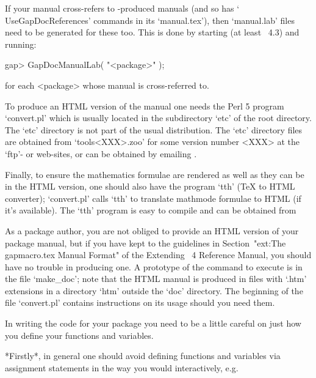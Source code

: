 If your manual cross-refers to -produced manuals (and  so
has  `\\UseGapDocReferences'  commands   in   its   `manual.tex'),   then
`manual.lab' files need to be generated for these too. This  is  done  by
starting {\GAP} (at least {\GAP}~4.3) and running:

gap> GapDocManualLab( "<package>" );

for each <package> whose manual is cross-referred to.

To produce an HTML version of the manual one needs  the  Perl  5  program
`convert.pl' which is usually located in the subdirectory  `etc'  of  the
{\GAP} root directory. The `etc' directory  is  not  part  of  the  usual
{\GAP}  distribution.  The  `etc'  directory  files  are  obtained   from
`tools<XXX>.zoo' for some version number <XXX> at the  {\GAP}  `ftp'-  or
web-sites,      or      can      be      obtained       by       emailing
.

Finally, to ensure the mathematics formulae are rendered as well as  they
can be in the HTML version,  one  should  also  have  the  program  `tth'
({\TeX}  to  HTML  converter);  `convert.pl'  calls  `tth'  to  translate
mathmode formulae to HTML (if it's available). The `tth' program is  easy
to compile and can be obtained from

As a package author, you are not obliged to provide an  HTML  version  of
your  package  manual,  but  if  you  have  kept  to  the  guidelines  in
Section~"ext:The gapmacro.tex Manual Format" of  the  Extending  {\GAP}~4
Reference Manual,  you  should  have  no  trouble  in  producing  one.  A
prototype of the command to execute is in the file `make_doc'; note  that
the HTML manual  is  produced  in  files  with  `.htm'  extensions  in  a
directory `htm' outside the `doc' directory. The beginning  of  the  file
`convert.pl' contains instructions on its usage should you need them.


In writing the {\GAP} code for your package  you  need  to  be  a  little
careful on just how you define your functions and variables.

*Firstly*, in general one should avoid defining functions  and  variables
via assignment statements in the way you would interactively, e.g.

